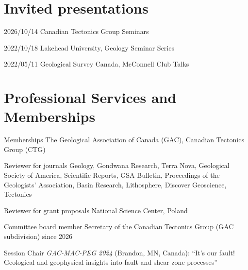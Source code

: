 \documentclass[10pt, paper=letter]{scrartcl} %
\begin{document}
\begin{cv}{}
  \section{Invited presentations}
    \begin{cvlist}{}
        \item[2026/10/14]{Canadian Tectonics Group Seminars}
        \item[2022/10/18]{Lakehead University, Geology Seminar Series}
        \item[2022/05/11]{Geological Survey Canada, McConnell Club Talks}
    \end{cvlist}

    \section{Professional Services and Memberships}
    \begin{cvlist}{}
        \item[Memberships] The Geological Association of Canada (GAC), Canadian Tectonics
        Group (CTG)%
        \item[Reviewer for journals] Geology, Gondwana Research, Terra Nova, Geological
        Society of America, Scientific Reports, GSA Bulletin, Proceedings of the Geologists'
        Association, Basin Research, Lithosphere, Discover Geoscience, Tectonics
        \item[Reviewer for grant proposals] National Science Center, Poland
        \item[Committee board member] Secretary of the Canadian
        Tectonics Group (GAC subdivision) since 2026
        \item[Session Chair] \textit{GAC-MAC-PEG 2024} (Brandon, MN, Canada): \enquote{It's
            our fault! Geological and geophysical insights into fault and shear zone
            processes}
    \end{cvlist}

\end{cv}
\end{document}
